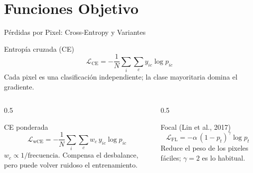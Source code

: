 \documentclass[aspectratio=169, 10pt]{beamer}
\begin{document}
\section{Funciones Objetivo}

\begin{frame}{P\'erdidas por Pixel: Cross-Entropy y Variantes}

	\begin{block}{Entrop\'ia cruzada (CE)}
		\small
		\[
		\mathcal{L}_{\text{CE}} = -\frac{1}{N} \sum_{i} \sum_{c} y_{ic} \log p_{ic}
		\]
		Cada pixel es una clasificaci\'on independiente; la clase mayoritaria domina el gradiente.
	\end{block}

	\begin{columns}[T]
		\begin{column}{0.5\textwidth}
			\begin{block}{CE ponderada}
				\small
				\[
				\mathcal{L}_{\text{wCE}} = -\frac{1}{N} \sum_{i} \sum_{c} w_c\, y_{ic} \log p_{ic}
				\]
				$w_c \propto 1/\text{frecuencia}$. Compensa el desbalance, pero puede volver ruidoso el entrenamiento.
			\end{block}
		\end{column}

		\begin{column}{0.5\textwidth}
			\begin{block}{Focal (Lin et al., 2017)}
				\small
				\[
				\mathcal{L}_{\text{FL}} = -\alpha\, (1 - p_t)^{\gamma} \log p_t
				\]
				Reduce el peso de los pixeles f\'aciles; $\gamma = 2$ es lo habitual.
			\end{block}
		\end{column}
	\end{columns}

\end{frame}
\end{document}
